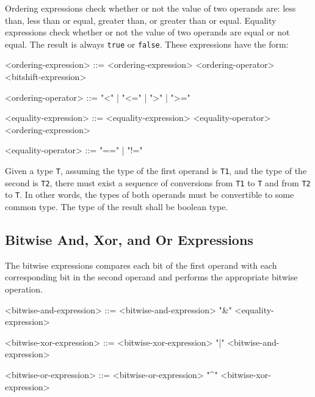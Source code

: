 Ordering expressions check whether or not the value of two operands are: less than, less than or equal, greater than, or greater than or equal. Equality expressions check whether or not the value of two operands are equal or not equal. The result is always \texttt{true} or \texttt{false}. These expressions have the form: 

\begin{minip}
\begin{grammar}
<ordering-expression> ::= <ordering-expression> 
<ordering-operator> <bitshift-expression>

<ordering-operator> ::= "<" | "<=" | ">" | ">="

<equality-expression> ::= <equality-expression>
<equality-operator> <ordering-expression>

<equality-operator> ::= "==" | "!="
\end{grammar}
\end{minip}

Given a type \texttt{T}, assuming the type of the first operand is \texttt{T1}, and the type of the second is \texttt{T2}, there must exist a sequence of conversions from \texttt{T1} to \texttt{T} and from \texttt{T2} to \texttt{T}. In other words, the types of both operands must be convertible to some common type. The type of the result shall be boolean type.

\subsection{Bitwise And, Xor, and Or Expressions} \label{guide:bitwise_expr}

The bitwise expressions compares each bit of the first operand with each corresponding bit in the second operand and performs the appropriate bitwise operation.

\begin{minip}
\begin{grammar}
<bitwise-and-expression> ::= <bitwise-and-expression> "\&" <equality-expression>

<bitwise-xor-expression> ::= <bitwise-xor-expression> "|" <bitwise-and-expression>

<bitwise-or-expression> ::= <bitwise-or-expression> "^" <bitwise-xor-expression>
\end{grammar}
\end{minip}

